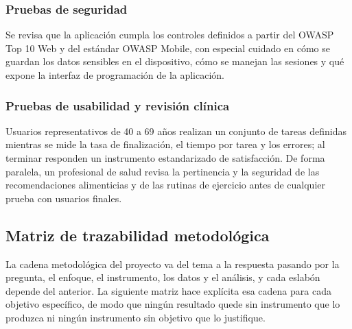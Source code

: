 \documentclass[conference]{IEEEtran}
\begin{document}
\subsubsection{Pruebas de seguridad}
Se revisa que la aplicación cumpla los controles definidos a partir del OWASP Top 10 Web y del estándar OWASP Mobile, con especial cuidado en cómo se guardan los datos sensibles en el dispositivo, cómo se manejan las sesiones y qué expone la interfaz de programación de la aplicación.

\subsubsection{Pruebas de usabilidad y revisión clínica}
Usuarios representativos de 40 a 69 años realizan un conjunto de tareas definidas mientras se mide la tasa de finalización, el tiempo por tarea y los errores; al terminar responden un instrumento estandarizado de satisfacción. De forma paralela, un profesional de salud revisa la pertinencia y la seguridad de las recomendaciones alimenticias y de las rutinas de ejercicio antes de cualquier prueba con usuarios finales.

\subsection{Matriz de trazabilidad metodológica}
La cadena metodológica del proyecto va del tema a la respuesta pasando por la pregunta, el enfoque, el instrumento, los datos y el análisis, y cada eslabón depende del anterior. La siguiente matriz hace explícita esa cadena para cada objetivo específico, de modo que ningún resultado quede sin instrumento que lo produzca ni ningún instrumento sin objetivo que lo justifique.
\end{document}
